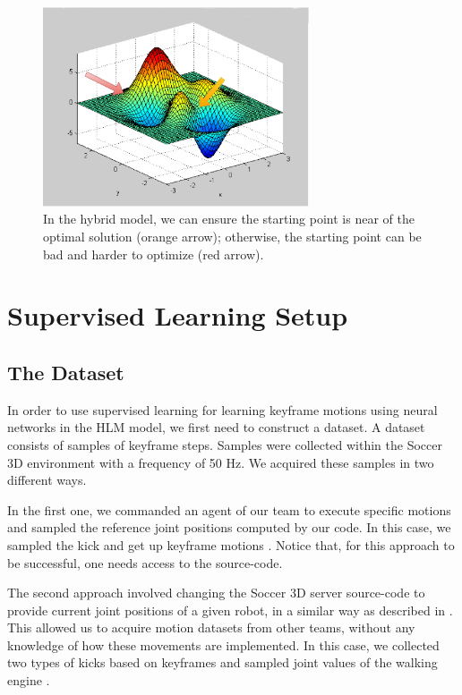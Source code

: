 \begin{figure}[!htbp]
	\centering
	\includegraphics[width=0.7\textwidth]{Cap5/optimization_final.eps}
	\caption{In the hybrid model, we can ensure the starting point is near of the optimal solution (orange arrow); otherwise, the starting point can be bad and harder to optimize (red arrow).}
	\label{optimization_intuition}
\end{figure}


\section{Supervised Learning Setup}\label{supervised_learning_setup}
\subsection{The Dataset}\label{AA}
In order to use supervised learning for learning keyframe motions using neural networks in the HLM model, we first need to construct a dataset. A dataset consists of samples of keyframe steps. Samples were collected within the Soccer 3D environment with a frequency of 50 Hz. We acquired these samples in two different ways.

In the first one, we commanded an agent of our team to execute specific motions and sampled the reference joint positions computed by our code. In this case, we sampled the kick and get up keyframe motions \cite{muniz2016}. Notice that, for this approach to be successful, one needs access to the source-code.

The second approach involved changing the Soccer 3D server source-code to provide current joint positions of a given robot, in a similar way as described in \cite{macalpine2013}. This allowed us to acquire motion datasets from other teams, without any knowledge of how these movements are implemented. In this case, we collected two types of kicks based on keyframes and sampled joint values of the walking engine \cite{AAAI12-MacAlpine}.


